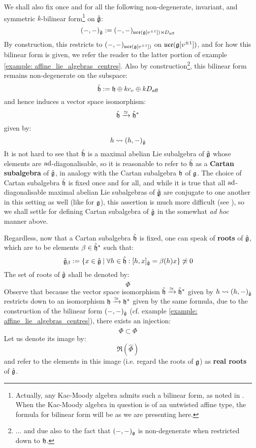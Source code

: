         We shall also fix once and for all the following non-degenerate, invariant, and symmetric $k$-bilinear form\footnote{Actually, any Kac-Moody algebra admits such a bilinear form, as noted in \cite[Chapter 2]{kac_infinite_dimensional_lie_algebras}. When the Kac-Moody algebra in question is of an untwisted affine type, the formula for bilinear form will be as we are presenting here.} on $\hat{\mathfrak{g}}$:
            $$(-, -)_{\hat{\mathfrak{g}}} := (-, -)_{\mathfrak{uce}(\mathfrak{g}[v^{\pm 1}]) \rtimes D_{\mathrm{aff}}}$$
        By construction, this restricts to $(-, -)_{\mathfrak{uce}(\mathfrak{g}[v^{\pm 1}])}$ on $\mathfrak{uce}(\mathfrak{g}[v^{\pm 1}])$, and for how this bilinear form is given, we refer the reader to the latter portion of example \ref{example: affine_lie_algebras_centres}. Also by construction\footnote{... and due also to the fact that $(-, -)_{\mathfrak{g}}$ is non-degenerate when restricted down to $\mathfrak{h}$.}, this bilinear form remains non-degenerate on the subspace:
            $$\hat{\mathfrak{h}} := \mathfrak{h} \oplus k c_v \oplus k D_{\mathrm{aff}}$$
        and hence induces a vector space isomorphism:
            $$\hat{\mathfrak{h}} \xrightarrow[]{\simeq} \hat{\mathfrak{h}}^*$$
        given by:
            $$h \leadsto (h, -)_{\hat{\mathfrak{g}}}$$
        It is not hard to see that $\hat{\mathfrak{h}}$ is a maximal abelian Lie subalgebra of $\hat{\mathfrak{g}}$ whose elements are $\mathrm{ad}$-diagonalisable, so it is reasonable to refer to $\hat{\mathfrak{h}}$ as a \textbf{Cartan subalgebra} of $\hat{\mathfrak{g}}$, in analogy with the Cartan subalgebra $\mathfrak{h}$ of $\mathfrak{g}$. The choice of Cartan subalgebra $\hat{\mathfrak{h}}$ is fixed once and for all, and while it is true that all $\mathrm{ad}$-diagonalisable maximal abelian Lie subalgebras of $\hat{\mathfrak{g}}$ are conjugate to one another in this setting as well (like for $\mathfrak{g}$), this assertion is much more difficult (see \cite{kac_peterson_infinite_flag_varieties_and_conjugacy_of_cartan_subalgebras}), so we shall settle for defining  Cartan subalgebra of $\hat{\mathfrak{g}}$ in the somewhat \textit{ad hoc} manner above.

        Regardless, now that a Cartan subalgebra $\hat{\mathfrak{h}}$ is fixed, one can speak of \textbf{roots} of $\hat{\mathfrak{g}}$, which are to be elements $\beta \in \hat{\mathfrak{h}}^*$ such that:
            $$\hat{\mathfrak{g}}_{\beta} := \{ x \in \hat{\mathfrak{g}} \mid \forall h \in \hat{\mathfrak{h}}: [h, x]_{\hat{\mathfrak{g}}} = \beta(h) x \} \not \simeq 0$$
        The set of roots of $\hat{\mathfrak{g}}$ shall be denoted by:
            $$\hat{\Phi}$$
        Observe that because the vector space isomorphism $\hat{\mathfrak{h}} \xrightarrow[]{\simeq} \hat{\mathfrak{h}}^*$ given by $h \leadsto (h, -)_{\hat{\mathfrak{g}}}$ restricts down to an isomorphism $\mathfrak{h} \xrightarrow[]{\simeq} \mathfrak{h}^*$ given by the same formula, due to the construction of the bilinear form $(-, -)_{\hat{\mathfrak{g}}}$ (cf. example \ref{example: affine_lie_algebras_centres}), there exists an injection:
            $$\Phi \subset \hat{\Phi}$$
        Let us denote its image by:
            $$\Re(\hat{\Phi})$$
        and refer to the elements in this image (i.e. regard the roots of $\mathfrak{g}$) as \textbf{real roots} of $\hat{\mathfrak{g}}$.
        
